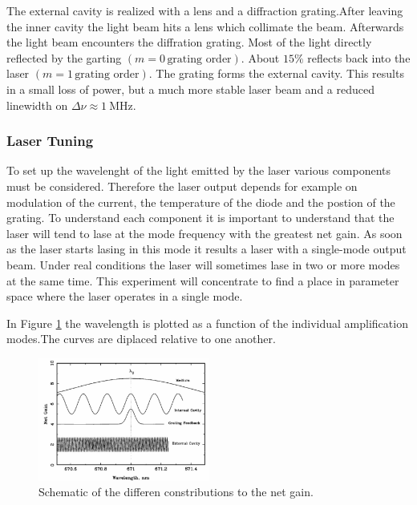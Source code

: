 The external cavity is realized with a lens and a diffraction grating.After leaving the inner cavity the light beam hits a lens which collimate the beam.
Afterwards the light beam encounters the diffration grating. Most of the light directly reflected by the garting  $\left(m = 0 \, \text{grating order}\right)$.
About $ 15 \% $ reflects back into the laser $\left(m = 1  \,\text{grating order}\right)$. The grating forms the external cavity.
This results in a small loss of power, but a much more stable laser beam and a reduced linewidth on $\Delta \nu \approx \qty{1}{\mega\hertz}$.

\subsubsection{Laser Tuning}
\label{sec:Laser Tuning}

To set up the wavelenght of the light emitted by the laser various components must be considered.
Therefore the laser output depends for example on modulation of the current, the temperature of the diode and the postion of the grating.
To understand each component it is important to understand that the laser will tend to lase at the mode frequency with the greatest net gain.
As soon as the laser starts lasing in this mode it results a laser with a single-mode output beam. Under real conditions the laser will sometimes lase 
in two or more modes at the same time. This experiment will concentrate to find a place in parameter space where the laser operates in a single mode.

In Figure \ref{fig:netgain} the wavelength is plotted as a function of the individual amplification modes.The curves are diplaced relative
to one another.
\begin{figure}[H]
    \centering
    \includegraphics[width=0.5\textwidth]{content/graphics/net_gain_components.jpg}
    \caption{Schematic of the differen constributions to the net gain.\cite{diode_laser}} %
    \label{fig:netgain}
\end{figure}

